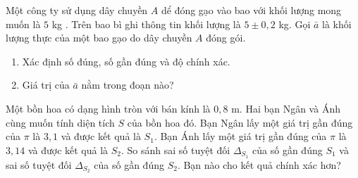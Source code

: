 \begin{bt}[H]%
Một công ty sử dụng dây chuyền $A$ dể đóng gạo vào bao với khối lượng mong muốn là $5$ kg . Trên bao bì ghi thông tin khối lượng là $5 \pm 0{,}2$ kg. Gọi $\bar{a}$ là khối lượng thực của một bao gạo do dây chuyền $A$ đóng gói.
\begin{enumerate}
	\item Xác định số đúng, số gần đúng và độ chính xác.
	\item Giá trị của $\bar{a}$ nằm trong đoạn nào?
\end{enumerate}
\end{bt}

\begin{bt}[SGK CD, H]%
Một bồn hoa có dạng hình tròn với bán kính là $0{,}8$ m. Hai bạn Ngân và Ánh cùng muốn tính diện tích $S$ của bồn hoa đó. Bạn Ngân lấy một giá trị gần đúng của $\pi$ là $3{,}1$ và được kết quả là $S_1$. Bạn Ánh lấy một giá trị gần đúng của $\pi$ là $3{,}14$ và được kết quả là $S_2$. So sánh sai số tuyệt đối $\Delta_{S_1}$ của số gần đúng $S_1$ và sai số tuyệt đối $\Delta_{S_2}$ của số gần đúng $S_2$. Bạn nào cho kết quả chính xác hơn?
\end{bt}

